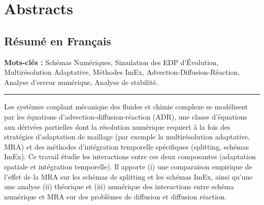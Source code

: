 \section*{Abstracts}
\subsection*{Résumé en Français}
    \textbf{Mots-clés :} Schémas Numériques, Simulation des EDP d'Évolution, Multirésolution Adaptative, Méthodes ImEx, 
    Advection-Diffusion-Réaction, Analyse d'erreur numérique, Analyse de stabilité.\par
    \noindent\rule{\textwidth}{0.4pt}
    Les systèmes couplant mécanique des fluides et chimie complexe se modélisent par les équations d'advection-diffusion-réaction (ADR), 
    une classe d'équations aux dérivées partielles dont la résolution numérique requiert à la fois des stratégies d'adaptation de maillage 
    (par exemple la multirésolution adaptative, MRA) et des méthodes d'intégration temporelle spécifiques (splitting, schémas ImEx).
    Ce travail étudie les interactions entre ces deux composantes (adaptation spatiale et intégration temporelle).
    Il apporte (i) une comparaison empirique de l'effet de la MRA sur les schémas de splitting et les schémas ImEx, 
    ainsi qu'une une analyse (ii) théorique et (iii) numérique des interactions entre schéma numérique et MRA sur des problèmes de diffusion et diffusion réaction.

